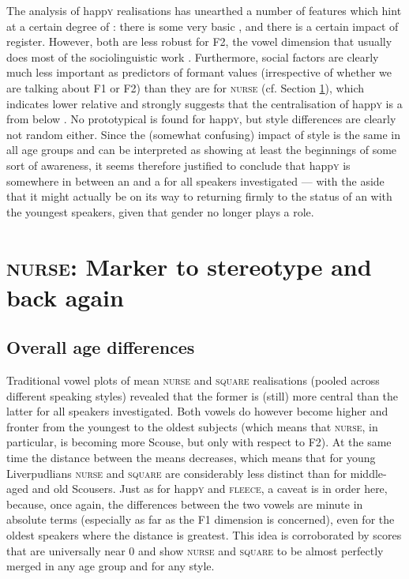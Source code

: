 The analysis of happ\textsc{y} realisations has unearthed a number of features which hint at a certain degree of : there is some very basic , and there is a certain impact of register.
However, both are less robust for F2, the vowel dimension that usually does most of the sociolinguistic work \parencite[cf.][502]{labov2006a}.
Furthermore, social factors are clearly much less important as predictors of formant values (irrespective of whether we are talking about F1 or F2) than they are for \textsc{nurse} (cf. Section \ref{prod.disc.nurse}), which indicates lower relative  and strongly suggests that the centralisation of happ\textsc{y} is a  from below \parencite[cf.][78]{labov1994}.
No prototypical  is found for happ\textsc{y}, but style differences are clearly not random either.
Since the (somewhat confusing) impact of style is the same in all age groups and can be interpreted as showing at least the beginnings of some sort of awareness, it seems therefore justified to conclude that happ\textsc{y} is somewhere in between an  and a  for all speakers investigated --- with the aside that it might actually be on its way to returning firmly to the status of an  with the youngest speakers, given that gender no longer plays a role.

\section{\textsc{nurse}: Marker to stereotype and back again}
\label{prod.disc.nurse}

\subsection{Overall age differences}
\label{prod.disc.nurse.age}

Traditional vowel plots of mean \textsc{nurse} and \textsc{square} realisations (pooled across different speaking styles) revealed that the former is (still) more central than the latter for all speakers investigated.
Both vowels do however become higher and fronter from the youngest to the oldest subjects (which means that \textsc{nurse}, in particular, is becoming more Scouse, but only with respect to F2).
At the same time the distance between the means decreases, which means that for young Liverpudlians \textsc{nurse} and \textsc{square} are considerably less distinct than for middle-aged and old Scousers.
Just as for happ\textsc{y} and \textsc{fleece}, a caveat is in order here, because, once again, the differences between the two vowels are minute in absolute terms (especially as far as the F1 dimension is concerned), even for the oldest speakers where the distance is greatest.
This idea is corroborated by  scores that are universally near 0 and show \textsc{nurse} and \textsc{square} to be almost perfectly merged in any age group and for any style.

